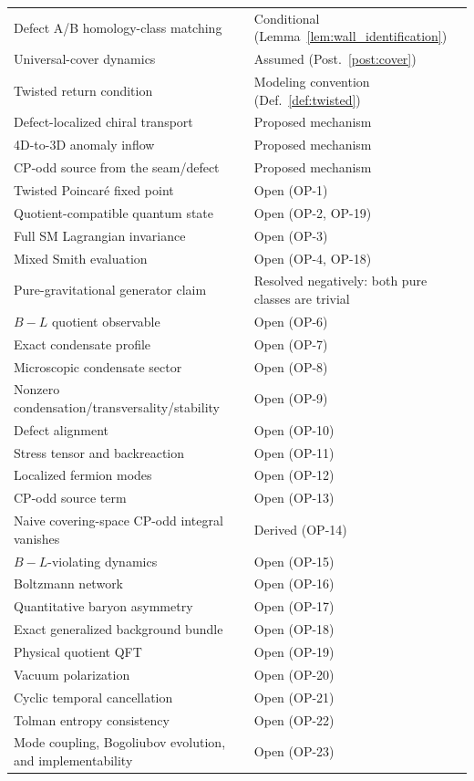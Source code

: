 \documentclass[11pt]{article}
\theoremstyle{canonmath}
\theoremstyle{canonpostulate}
\theoremstyle{canonclaim}
\begin{document}
\begin{table}[H]
\begin{tabular}{@{}p{}p{}@{}}
Defect A/B homology-class matching & Conditional (Lemma~\ref{lem:wall_identification}) \\
Universal-cover dynamics & Assumed (Post.~\ref{post:cover}) \\
Twisted return condition & Modeling convention (Def.~\ref{def:twisted}) \\
Defect-localized chiral transport & Proposed mechanism \\
4D-to-3D anomaly inflow & Proposed mechanism \\
CP-odd source from the seam/defect & Proposed mechanism \\
Twisted Poincar\'e fixed point & Open (OP-1) \\
Quotient-compatible quantum state & Open (OP-2, OP-19) \\
Full SM Lagrangian invariance & Open (OP-3) \\
Mixed Smith evaluation & Open (OP-4, OP-18) \\
Pure-gravitational generator claim & Resolved negatively: both pure classes are trivial \\
$B-L$ quotient observable & Open (OP-6) \\
Exact condensate profile & Open (OP-7) \\
Microscopic condensate sector & Open (OP-8) \\
Nonzero condensation/transversality/stability & Open (OP-9) \\
Defect alignment & Open (OP-10) \\
Stress tensor and backreaction & Open (OP-11) \\
Localized fermion modes & Open (OP-12) \\
CP-odd source term & Open (OP-13) \\
Naive covering-space CP-odd integral vanishes & Derived (OP-14) \\
$B-L$-violating dynamics & Open (OP-15) \\
Boltzmann network & Open (OP-16) \\
Quantitative baryon asymmetry & Open (OP-17) \\
Exact generalized background bundle & Open (OP-18) \\
Physical quotient QFT & Open (OP-19) \\
Vacuum polarization & Open (OP-20) \\
Cyclic temporal cancellation & Open (OP-21) \\
Tolman entropy consistency & Open (OP-22) \\
Mode coupling, Bogoliubov evolution, and implementability & Open (OP-23) \\
\bottomrule
\end{tabular}
\end{table}
\end{document}
